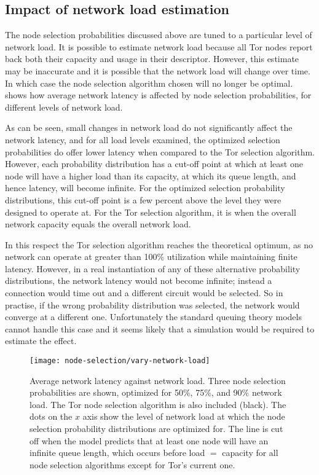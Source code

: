 \documentclass{article}
\begin{document}
\subsection{Impact of network load estimation}

The node selection probabilities discussed above are tuned to a particular level of network load.
It is possible to estimate network load because all Tor nodes report back both their capacity and usage in their descriptor.
However, this estimate may be inaccurate and it is possible that the network load will change over time.
In which case the node selection algorithm chosen will no longer be optimal.
 shows how average network latency is affected by node selection probabilities, for different levels of network load.

As can be seen, small changes in network load do not significantly affect the network latency, and for all load levels examined, the optimized selection probabilities do offer lower latency when compared to the Tor selection algorithm.
However, each probability distribution has a cut-off point at which at least one node will have a higher load than its capacity, at which its queue length, and hence latency, will become infinite.
For the optimized selection probability distributions, this cut-off point is a few percent above the level they were designed to operate at.
For the Tor selection algorithm, it is when the overall network capacity equals the overall network load.

In this respect the Tor selection algorithm reaches the theoretical optimum, as no network can operate at greater than 100\% utilization while maintaining finite latency.
However, in a real instantiation of any of these alternative probability distributions, the network latency would not become infinite; instead a connection would time out and a different circuit would be selected.
So in practise, if the wrong probability distribution was selected, the network would converge at a different one.
Unfortunately the standard queuing theory models cannot handle this case and it seems likely that a simulation would be required to estimate the effect.

\begin{figure}
\texttt{[image: node-selection/vary-network-load]}
\caption{Average network latency against network load. Three node selection probabilities are shown, optimized for 50\%, 75\%, and 90\% network load. The Tor node selection algorithm is also included (black). The dots on the $x$ axis show the level of network load at which the node selection probability distributions are optimized for. The line is cut off when the model predicts that at least one node will have an infinite queue length, which occurs before load $=$ capacity for all node selection algorithms except for Tor's current one.}
\label{fig:vary-load}
\end{figure}
\end{document}
